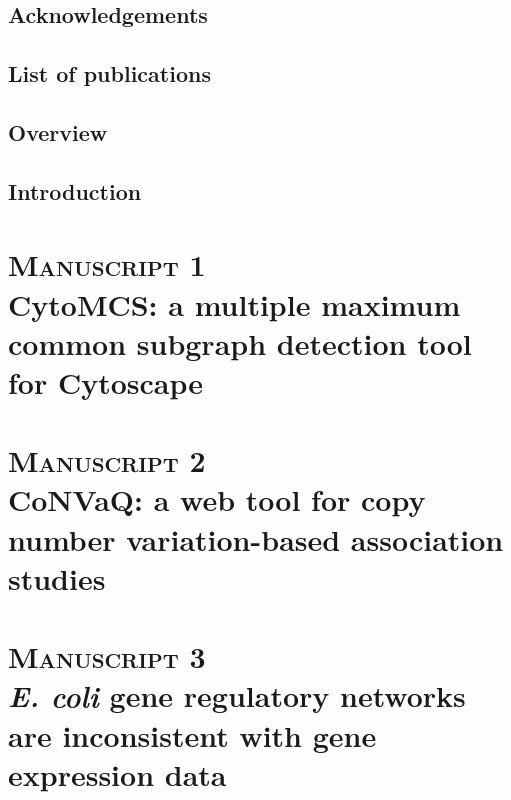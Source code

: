 \documentclass[a4paper,12pt,onecolumn,twoside,final]{memoir}
\begin{document}
\clearpage
\section{Acknowledgements}


\clearpage
\section{List of publications}


\clearpage
\section{Overview}


\clearpage
\tableofcontents
\mainmatter
\begin{refsection}
\chapter{Introduction}

\clearpage
\printbibliography[heading=subbibintoc]
\end{refsection}

\chapter[Manuscript 1: CytoMCS: a multiple maximum common subgraph detection tool for Cytoscape]{\textsc{Manuscript 1}\\CytoMCS: a multiple maximum common subgraph detection tool for Cytoscape}


\chapter[Manuscript 2: CoNVaQ: a web tool for copy number variation-based association studies]{\textsc{Manuscript 2}\\CoNVaQ: a web tool for copy number variation-based association studies}


\chapter[Manuscript 3: \emph{E. coli} gene regulatory networks are inconsistent with gene expression data]{\textsc{Manuscript 3}\\\emph{E. coli} gene regulatory networks are inconsistent with gene expression data}

\end{document}
